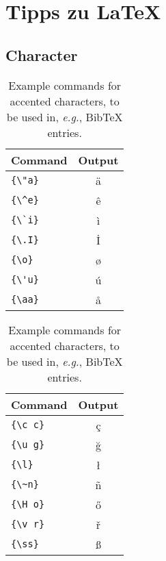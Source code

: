 \documentclass[11pt,a4paper,twoside,openright]{scrbook}
\begin{document}
\chapter{Tipps zu \LaTeX}

\section{Character}
\begin{table}[h]
  \centering
  \begin{tabular}{lc}
  \hline
  \textbf{Command} & \textbf{Output}\\
  \hline
  \verb|{\"a}| & {\"a} \\
  \verb|{\^e}| & {\^e} \\
  \verb|{\`i}| & {\`i} \\ 
  \verb|{\.I}| & {\.I} \\ 
  \verb|{\o}| & {\o} \\
  \verb|{\'u}| & {\'u}  \\ 
  \verb|{\aa}| & {\aa}  \\\hline
  \end{tabular}
  \begin{tabular}{lc}
  \hline
  \textbf{Command} & \textbf{Output}\\
  \hline
  \verb|{\c c}| & {\c c} \\ 
  \verb|{\u g}| & {\u g} \\ 
  \verb|{\l}| & {\l} \\ 
  \verb|{\~n}| & {\~n} \\ 
  \verb|{\H o}| & {\H o} \\ 
  \verb|{\v r}| & {\v r} \\ 
  \verb|{\ss}| & {\ss} \\
  \hline
  \end{tabular}
  \caption{Example commands for accented characters, to be used in, \emph{e.g.}, Bib\TeX{} entries.}
  \label{tab:accents}
  \end{table}




\end{document}
